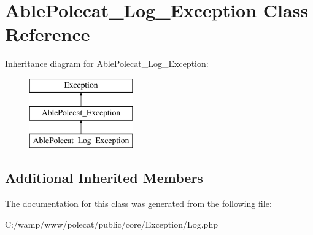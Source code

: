 \hypertarget{class_able_polecat___log___exception}{}\section{Able\+Polecat\+\_\+\+Log\+\_\+\+Exception Class Reference}
\label{class_able_polecat___log___exception}
Inheritance diagram for Able\+Polecat\+\_\+\+Log\+\_\+\+Exception\+:\begin{figure}[H]
\begin{center}
\leavevmode
\includegraphics[height=3.000000cm]{class_able_polecat___log___exception}
\end{center}
\end{figure}
\subsection*{Additional Inherited Members}


The documentation for this class was generated from the following file\+:\begin{DoxyCompactItemize}
\item 
C\+:/wamp/www/polecat/public/core/\+Exception/Log.\+php\end{DoxyCompactItemize}
